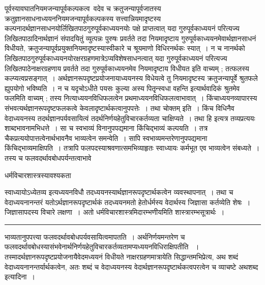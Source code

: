\documentclass[11pt, openany]{book}
\begin{document}
पूर्वस्यावघातनियमजन्यापूर्वकल्पकत्व\textemdash\ वदेव च क्रतुजन्यापूर्वजातस्य क्रतुज्ञानसाधनाध्ययननियमजन्यापूर्वकल्पकस्य सत्त्वान्नियमादृष्टस्य
कल्पनादर्थज्ञानसाधनयोर्लिखितपाठगुरुपूर्वकाध्ययनयोः पक्षे प्राप्तत्वात् यदा गुरुपूर्वकाध्ययनं परित्यज्य लिखितपाठादिनार्थज्ञानं संपादयितुं व्युत्पन्नः पुरुषः प्रवर्तते तदा नियमादृष्टाय गुरुपूर्वकाध्ययनमेवार्थज्ञानसाधनं विधीयते, क्रतुजन्यापूर्वप्रयुक्तनियमादृष्टस्यास्वीकारे च श्रूयमाणो विधिरनर्थकः स्यात्~। न च नानर्थको
लिखितपाठगुरुपूर्वकाध्ययनयोरक्षरग्रहणमात्रेऽप्यविशेषसाधनत्वात् यदा गुरुपूर्वकाध्ययनं परित्यज्य लिखितपाठेनाक्षरग्रहणाय प्रवर्तते तदा गुरुपूर्वकाध्ययनमेव नियमादृष्टाय विधीयत इति वाच्यम् ; तत्फलस्य कल्प्यत्वप्रसङ्गात्~। अर्थज्ञानरूपदृष्टप्रयोजनायाध्ययनस्य विधेयत्वे तु नियमादृष्टस्य क्रतुजन्यापूर्वे श्रुतफले ह्युपयोगो भविष्यति~। न च
{\qt यदृचोऽधीते पयसः कुल्या अस्य पितृृन्स्वधा वहन्ति} इत्यार्थवादिकं श्रुतमेव फलमिति वाच्यम् ; तस्य नित्याध्ययनविधिफलत्वेन प्रथमाध्ययनविधिफलत्वाभावात्~। किंचाध्ययनव्यापारस्य संभवत्यर्थज्ञानरूपदृष्टफलकत्वे केवलादृष्टार्थकत्वानुपपत्तेः~। तथा चोक्तम् इति~। किंच विधिनैव वेदाध्ययनस्य तदर्थज्ञानपर्यवसायित्वं तदर्थनिर्णयहेतुविचारकर्तव्यता चाक्षिप्यते~। तथा हि इत्यत्र तव्यप्रत्ययः शाब्दभावनामभिधत्ते~। सा च स्वभाव्यं विनानुपपद्यमाना किंचिद्भाव्यं कल्पयति~। तत्र चैकप्रत्ययोपात्तत्वेनार्थभावनैव भाव्यत्वेन समन्वेति~। सापि स्वभाव्यमन्तरेणानुपपद्यमाना किंचिद्भाव्यमाक्षिपति~। तत्रापि फलपदस्याश्रवणात्समभिव्याहृतः स्वाध्यायः कर्मभूत एव भाव्यत्वेन संबध्यते~।
तस्य च फलवदर्थावबोधपर्यन्तत्वाभावे 
\newpage
\fancyhead[LO]{[धर्म०शास्त्रस्यावश्यकता ]} 
\begin{center}
धर्मविचारशास्त्रस्यावश्यकता     
\end{center}

{\bl
{\qtl स्वाध्यायोऽध्येतव्य} इत्यध्ययनविधौ तदध्ययनस्यार्थज्ञानरूपदृष्टार्थकत्वेन व्यवस्थापनात्~। तथा च वेदाध्ययनानन्तरं यतोऽर्थज्ञानरूपदृष्टार्थकं तदध्ययनमतो हेतोर्धर्मस्य
वेदार्थस्य जिज्ञासा कर्तव्येति शेषः~। जिज्ञासापदस्य विचारे लक्षणा~। अतो धर्मविचारशास्त्रमिदारम्भणीयमिति शास्त्रारम्भसूत्रार्थः~।}\\
\hrule
\vspace{3mm}
\noindent
भाव्यतानुपपत्त्या फलवदर्थावबोधपर्यवसायित्वमापतति~। अर्थनिर्णयमन्तरेण च फलवदर्थावबोधस्यासंभवेनार्थनिर्णयहेतुविचारकर्तव्यतामप्यध्ययनविधिराक्षिपतीति
~। तस्मादर्थज्ञानरूपदृष्टप्रयोजनायैवेदमध्ययनं विधीयते नाक्षरग्रहणमात्रायेति सिद्धान्तमभिप्रेत्य, {\qt अथ} शब्दं वेदाध्ययनानन्तर्यार्थकत्वेन, {\qt अतः} शब्दं च वेदाध्ययनस्य
वेदार्थज्ञानरूपदृष्टार्थकत्वपरत्वेन च व्याचष्टे  {\br अथशब्द इत्यादिना~।} \\
\end{document}
